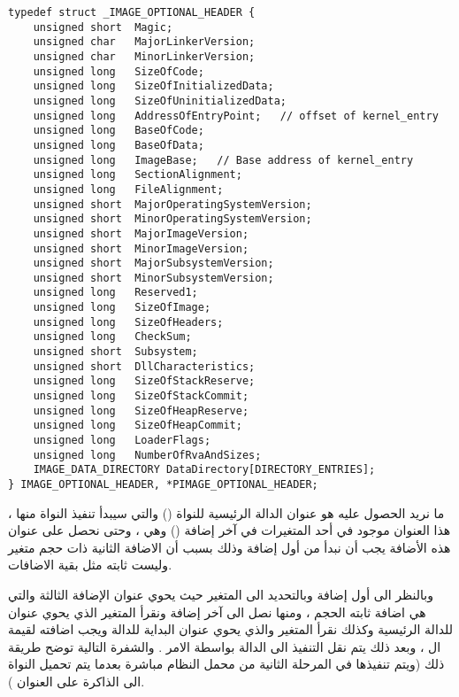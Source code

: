 \documentclass[document.tex]{subfiles}
\begin{document}
\begin{english}
\begin{lstlisting}[label=pe_hdr,caption=\en{Portable Executable Header}]
typedef struct _IMAGE_OPTIONAL_HEADER {
    unsigned short  Magic;
    unsigned char   MajorLinkerVersion;
    unsigned char   MinorLinkerVersion;
    unsigned long   SizeOfCode;
    unsigned long   SizeOfInitializedData;
    unsigned long   SizeOfUninitializedData;
    unsigned long   AddressOfEntryPoint;   // offset of kernel_entry
    unsigned long   BaseOfCode;
    unsigned long   BaseOfData;
    unsigned long   ImageBase;   // Base address of kernel_entry
    unsigned long   SectionAlignment;
    unsigned long   FileAlignment;
    unsigned short  MajorOperatingSystemVersion;
    unsigned short  MinorOperatingSystemVersion;
    unsigned short  MajorImageVersion;
    unsigned short  MinorImageVersion;
    unsigned short  MajorSubsystemVersion;
    unsigned short  MinorSubsystemVersion;
    unsigned long   Reserved1;
    unsigned long   SizeOfImage;
    unsigned long   SizeOfHeaders;
    unsigned long   CheckSum;
    unsigned short  Subsystem;
    unsigned short  DllCharacteristics;
    unsigned long   SizeOfStackReserve;
    unsigned long   SizeOfStackCommit;
    unsigned long   SizeOfHeapReserve;
    unsigned long   SizeOfHeapCommit;
    unsigned long   LoaderFlags;
    unsigned long   NumberOfRvaAndSizes;
    IMAGE_DATA_DIRECTORY DataDirectory[DIRECTORY_ENTRIES];
} IMAGE_OPTIONAL_HEADER, *PIMAGE_OPTIONAL_HEADER;

\end{lstlisting}
\end{english}

ما نريد الحصول عليه هو عنوان الدالة الرئيسية للنواة () والتي سيبدأ تنفيذ النواة منها ، هذا العنوان موجود في أحد المتغيرات في آخر إضافة () وهي  ، وحتى نحصل على عنوان هذه الأضافة يجب أن نبدأ من أول إضافة وذلك بسبب أن الاضافة الثانية ذات حجم متغير وليست ثابته مثل بقية الاضافات.


وبالنظر الى أول إضافة   وبالتحديد الى المتغير  حيث يحوي عنوان الإضافة الثالثة  والتي هي اضافة ثابته الحجم ، ومنها نصل الى آخر إضافة ونقرأ المتغير  الذي يحوي عنوان  للدالة الرئيسية وكذلك نقرأ المتغير  والذي يحوي عنوان البداية للدالة ويجب اضافته لقيمة ال  ، وبعد ذلك يتم نقل التنفيذ الى الدالة بواسطة الامر . والشفرة التالية توضح طريقة ذلك (ويتم تنفيذها في المرحلة الثانية من محمل النظام مباشرة بعدما يتم تحميل النواة الى الذاكرة على العنوان ).

\end{document}
